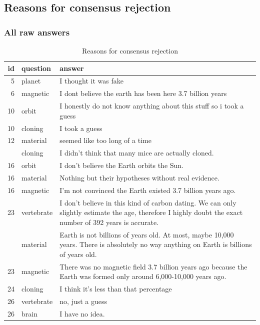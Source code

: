 \documentclass[
  doc,floatsintext]{apa6}
\begin{document}
\subsection{Reasons for consensus rejection}\label{reasons-for-consensus-rejection-2}

\subsubsection{All raw answers}\label{all-raw-answers-2}

\begin{longtable}[t]{>{}r>{}l>{\raggedright\arraybackslash}p{30em}}
\caption{\label{tab:exp4-reasons-rejection}Reasons for consensus rejection}\\
\toprule
id & question & answer\\
\midrule
5 & planet & I thought it was fake\\
6 & magnetic & I dont believe the earth has been here 3.7 billion years\\
10 & orbit & I honestly do not know anything about this stuff so i took a guess\\
10 & cloning & I took a guess\\
12 & material & seemed like too long of a time\\
\addlinespace
14 & cloning & I didn't think that many mice are actually cloned.\\
16 & orbit & I don't believe the Earth orbits the Sun.\\
16 & material & Nothing but their hypotheses without real evidence.\\
16 & magnetic & I'm not convinced the Earth existed 3.7 billion years ago.\\
23 & vertebrate & I don't believe in this kind of carbon dating. We can only slightly estimate the age, therefore I highly doubt the exact number of 392 years is accurate.\\
\addlinespace
23 & material & Earth is not billions of years old. At most, maybe 10,000 years. There is absolutely no way anything on Earth is billions of years old.\\
23 & magnetic & There was no magnetic field 3.7 billion years ago because the Earth was formed only around 6,000-10,000 years ago.\\
24 & cloning & I think it's less than that percentage\\
26 & vertebrate & no, just a guess\\
26 & brain & I have no idea.\\

\end{longtable}
\end{document}
